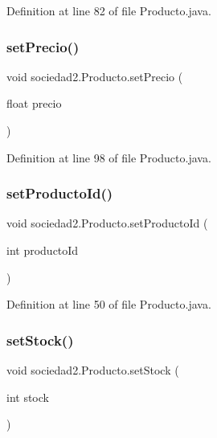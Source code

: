 Definition at line 82 of file Producto.\+java.

\mbox{\label{classsociedad2_1_1_producto_afd60e3881905bdd4c196d21c5545eadc}} 
\subsubsection{\texorpdfstring{set\+Precio()}{setPrecio()}}
{\footnotesize\ttfamily void sociedad2.\+Producto.\+set\+Precio (\begin{DoxyParamCaption}\item[{float}]{precio }\end{DoxyParamCaption})}



Definition at line 98 of file Producto.\+java.

\mbox{\label{classsociedad2_1_1_producto_a5e27c5c7790d1918a32e71f51f9834f7}} 
\subsubsection{\texorpdfstring{set\+Producto\+Id()}{setProductoId()}}
{\footnotesize\ttfamily void sociedad2.\+Producto.\+set\+Producto\+Id (\begin{DoxyParamCaption}\item[{int}]{producto\+Id }\end{DoxyParamCaption})}



Definition at line 50 of file Producto.\+java.

\mbox{\label{classsociedad2_1_1_producto_ae8833d16f4253ed066e0d9fb78cfb954}} 
\subsubsection{\texorpdfstring{set\+Stock()}{setStock()}}
{\footnotesize\ttfamily void sociedad2.\+Producto.\+set\+Stock (\begin{DoxyParamCaption}\item[{int}]{stock }\end{DoxyParamCaption})}



